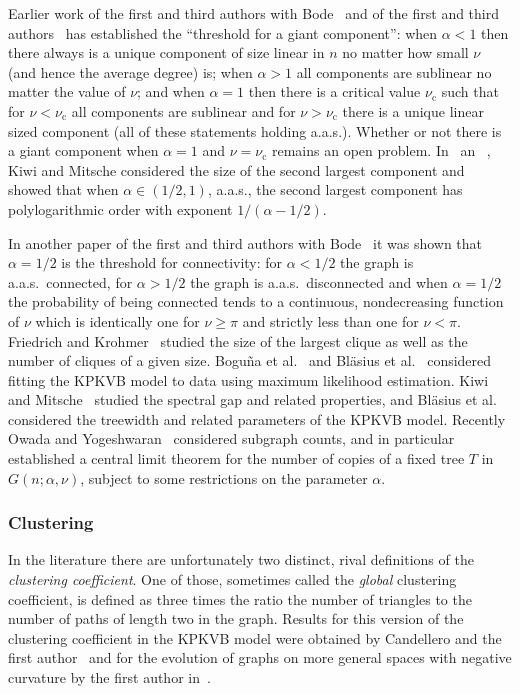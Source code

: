 Earlier work of the first and third authors with Bode~\cite{bode2015largest} and of the first and third authors~\cite{fountoulakis2018law} has 
established the ``threshold for a giant component'': when $\alpha < 1$ then there always is a unique component of size linear in $n$ no matter how small 
$\nu$ (and hence the average degree) is; when $\alpha > 1$ all components are sublinear no matter the value of $\nu$; and when $\alpha=1$ then 
there is a critical value $\nu_{\text{c}}$ such that for $\nu < \nu_{\text{c}}$ all components are sublinear and for $\nu > \nu_{\text{c}}$ there 
is a unique linear sized component (all of these statements holding a.a.s.). 
Whether or not there is a giant component when $\alpha=1$ and $\nu=\nu_{\text{c}}$ remains an open problem.
In~\cite{KiwiMit} an ~\cite{KiwiMit2017+}, Kiwi and Mitsche considered the size of the second largest component and
showed that when $\alpha \in (1/2, 1)$, a.a.s., the second largest component has polylogarithmic order with exponent 
$1/(\alpha -1/2)$.


In another paper of the first and third authors with Bode~\cite{BFMconnRSA} it was shown that $\alpha=1/2$ is the threshold for connectivity:
for $\alpha < 1/2$ the graph is a.a.s.~connected, for $\alpha>1/2$ the graph is a.a.s.~disconnected and when $\alpha=1/2$ the probability 
of being connected tends to a continuous, nondecreasing function of $\nu$ which is identically one for $\nu \geq \pi$ and strictly less than one 
for $\nu < \pi$.
Friedrich and Krohmer~\cite{blasius2018cliques} studied the size of the largest clique as well as the number of cliques of a given size.
Bogu\~{n}a et al.~\cite{sustaining} and Bl\"asius et al.~\cite{BlasiusMLE} considered fitting the KPKVB model to data using maximum likelihood 
estimation.
Kiwi and Mitsche~\cite{KM18} studied the spectral gap and related properties, and Bl\"asius et al.~\cite{BlasiusTW} considered the treewidth 
and related parameters of the KPKVB model.
Recently Owada and Yogeshwaran~\cite{OY} considered subgraph counts, and in particular established a central limit theorem 
for the number of copies of a fixed tree $T$ in $G(n;\alpha,\nu)$, subject to some restrictions on the parameter $\alpha$.

\subsubsection*{Clustering}

In the literature there are unfortunately two distinct, rival definitions of the {\em clustering coefficient}.
One of those, sometimes called the {\em global} clustering coefficient, is defined as 
three times the ratio the number of triangles to the number of paths of length two in the graph.
Results for this version of the clustering coefficient in the KPKVB model were obtained by Candellero and the first author~\cite{candellero2016clustering} and for the evolution of graphs on more general spaces with negative curvature by the first author in~\cite{F12}. 

